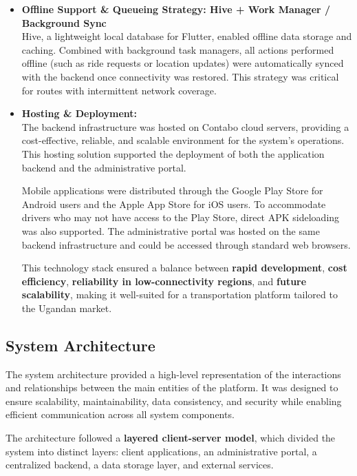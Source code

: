 \begin{itemize}
 \item \textbf{Offline Support \& Queueing Strategy: Hive + Work Manager
        / Background Sync} \\
Hive, a lightweight local database for Flutter, enabled offline data storage and
caching. Combined with background task managers, all actions performed offline
(such as ride requests or location updates) were automatically synced with the
backend once connectivity was restored. This strategy was critical for routes
with intermittent network coverage.


 \item \textbf{Hosting \& Deployment:} \\
The backend infrastructure was hosted on Contabo cloud servers, providing a cost-effective, reliable, and scalable environment for the system's operations. This hosting solution supported the deployment of both the application backend and the administrative portal.

Mobile applications were distributed through the Google Play Store for Android users and the Apple App Store for iOS users. To accommodate drivers who may not have access to the Play Store, direct APK sideloading was also supported. The administrative portal was hosted on the same backend infrastructure and could be accessed through standard web browsers.

This technology stack ensured a balance between \textbf{rapid development},
\textbf{cost efficiency}, \textbf{reliability in low-connectivity regions}, and
\textbf{future scalability}, making it well-suited for a transportation platform
tailored to the Ugandan market.

\end{itemize}

\subsection{System Architecture}

The system architecture provided a high-level representation of the interactions
and relationships between the main entities of the platform. It was designed to
ensure scalability, maintainability, data consistency, and security while
enabling efficient communication across all system components.


The architecture followed a \textbf{layered client-server model}, which divided
the system into distinct layers: client applications, an administrative portal,
a centralized backend, a data storage layer, and external services.


